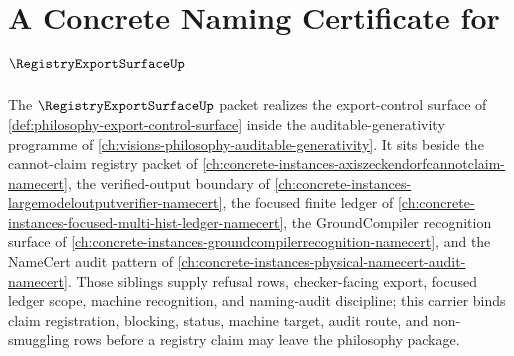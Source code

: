 \chapter{A Concrete Naming Certificate for $\RegistryExportSurfaceUp$}
\label{ch:concrete-instances-registry-export-surface-namecert}

The $\RegistryExportSurfaceUp$ packet realizes the export-control surface of \autoref{def:philosophy-export-control-surface} inside the auditable-generativity programme of \autoref{ch:visions-philosophy-auditable-generativity}. It sits beside the cannot-claim registry packet of \autoref{ch:concrete-instances-axiszeckendorfcannotclaim-namecert}, the verified-output boundary of \autoref{ch:concrete-instances-largemodeloutputverifier-namecert}, the focused finite ledger of \autoref{ch:concrete-instances-focused-multi-hist-ledger-namecert}, the GroundCompiler recognition surface of \autoref{ch:concrete-instances-groundcompilerrecognition-namecert}, and the NameCert audit pattern of \autoref{ch:concrete-instances-physical-namecert-audit-namecert}. Those siblings supply refusal rows, checker-facing export, focused ledger scope, machine recognition, and naming-audit discipline; this carrier binds claim registration, blocking, status, machine target, audit route, and non-smuggling rows before a registry claim may leave the philosophy package.

